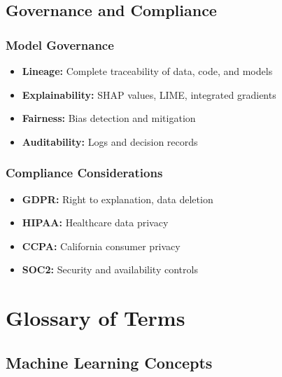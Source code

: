 \documentclass[11pt]{article}
\begin{document}
\subsection{Governance and Compliance}

\subsubsection{Model Governance}
\begin{itemize}
    \item \textbf{Lineage:} Complete traceability of data, code, and models
    \item \textbf{Explainability:} SHAP values, LIME, integrated gradients
    \item \textbf{Fairness:} Bias detection and mitigation
    \item \textbf{Auditability:} Logs and decision records
\end{itemize}

\subsubsection{Compliance Considerations}
\begin{itemize}
    \item \textbf{GDPR:} Right to explanation, data deletion
    \item \textbf{HIPAA:} Healthcare data privacy
    \item \textbf{CCPA:} California consumer privacy
    \item \textbf{SOC2:} Security and availability controls
\end{itemize}

\section{Glossary of Terms}

\printglossary[title=Glossary, toctitle=Glossary]

\subsection{Machine Learning Concepts}
\end{document}
